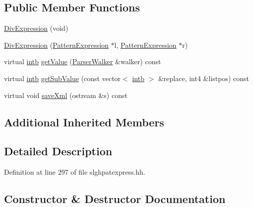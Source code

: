 \subsection*{Public Member Functions}
\begin{DoxyCompactItemize}
\item 
\mbox{\hyperlink{class_div_expression_a5c9cccc5f19e3583a7ab0342475b044d}{Div\+Expression}} (void)
\item 
\mbox{\hyperlink{class_div_expression_ae9bcb8749839451f7474a6f74c347271}{Div\+Expression}} (\mbox{\hyperlink{class_pattern_expression}{Pattern\+Expression}} $\ast$l, \mbox{\hyperlink{class_pattern_expression}{Pattern\+Expression}} $\ast$r)
\item 
virtual \mbox{\hyperlink{types_8h_aa925ba3e627c2df89d5b1cfe84fb8572}{intb}} \mbox{\hyperlink{class_div_expression_ab7f9f33b65f50d8b246ab69694cbf150}{get\+Value}} (\mbox{\hyperlink{class_parser_walker}{Parser\+Walker}} \&walker) const
\item 
virtual \mbox{\hyperlink{types_8h_aa925ba3e627c2df89d5b1cfe84fb8572}{intb}} \mbox{\hyperlink{class_div_expression_ae6015a985bb843e4de0debf6387d1259}{get\+Sub\+Value}} (const vector$<$ \mbox{\hyperlink{types_8h_aa925ba3e627c2df89d5b1cfe84fb8572}{intb}} $>$ \&replace, int4 \&listpos) const
\item 
virtual void \mbox{\hyperlink{class_div_expression_ac366efa9af2e0a858b06e1a8e3479aa9}{save\+Xml}} (ostream \&s) const
\end{DoxyCompactItemize}
\subsection*{Additional Inherited Members}


\subsection{Detailed Description}


Definition at line 297 of file slghpatexpress.\+hh.



\subsection{Constructor \& Destructor Documentation}
\mbox{\label{class_div_expression_a5c9cccc5f19e3583a7ab0342475b044d}} 
